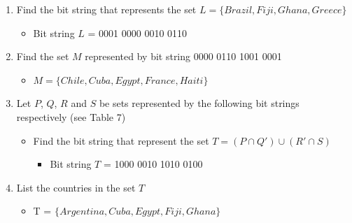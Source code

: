 \documentclass[12pt,a4paper]{article}
\begin{document}
\begin{enumerate}
\item Find the bit string that represents the set $L = \{Brazil, Fiji, Ghana, Greece\}$
	\begin{itemize}
	\item Bit string $L$ = 0001 0000 0010 0110
	\end{itemize}
\item Find the set $M$ represented by bit string 0000 0110 1001 0001
	\begin{itemize}
	\item $M = \{Chile, Cuba, Egypt, France, Haiti\}$
	\end{itemize}
\item Let $P$, $Q$, $R$ and $S$ be sets represented by the following bit strings respectively (see Table 7)
	\begin{itemize}
	\item Find the bit string that represent the set $T = (P \cap Q') \cup (R' \cap S)$
		\begin{itemize}
		\item Bit string $T$ = 1000 0010 1010 0100
		\end{itemize}
	\end{itemize}
\item List the countries in the set $T$
	\begin{itemize}
	\item T = $\{Argentina, Cuba, Egypt, Fiji, Ghana\}$
	\end{itemize}
\end{enumerate}
\end{document}
